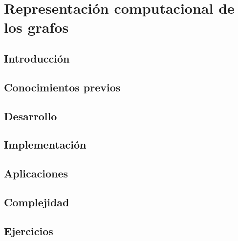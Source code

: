 \chapter{Representación computacional de los grafos}
\section{Introducción}

\section{Conocimientos previos}

\section{Desarrollo}

\section{Implementación}

\section{Aplicaciones}

\section{Complejidad}

\section{Ejercicios}
